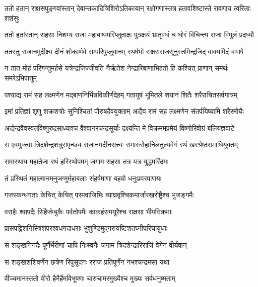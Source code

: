 
\twolineshloka
{ततो हतान् राक्षसपुङ्गवांस्तान् देवान्तकादित्रिशिरोऽतिकायान्}
{रक्षोगणास्तत्र हतावशिष्टास्ते रावणाय त्वरिताः शशंसुः} %

\twolineshloka
{ततो हतांस्तान् सहसा निशम्य राजा महाबाष्पपरिप्लुताक्षः}
{पुत्रक्षयं भ्रातृवधं च घोरं विचिन्त्य राजा विपुलं प्रदध्यौ} %

\twolineshloka
{ततस्तु राजानमुदीक्ष्य दीनं शोकार्णवे सम्परिपुप्लुवानम्}
{रथर्षभो राक्षसराजसूनुस्तमिन्द्रजिद् वाक्यमिदं बभाषे} %

\twolineshloka
{न तात मोहं परिगन्तुमर्हसे यत्रेन्द्रजिज्जीवति नैर्ऋतेश}
{नेन्द्रारिबाणाभिहतो हि कश्चित् प्राणान् समर्थः समरेऽभिपातुम्} %

\twolineshloka
{पश्याद्य रामं सह लक्ष्मणेन मद्बाणनिर्भिन्नविकीर्णदेहम्}
{गतायुषं भूमितले शयानं शितैः शरैराचितसर्वगात्रम्} %

\twolineshloka
{इमां प्रतिज्ञां शृणु शक्रशत्रोः सुनिश्चितां पौरुषदैवयुक्ताम्}
{अद्यैव रामं सह लक्ष्मणेन संतर्पयिष्यामि शरैरमोघैः} %

\twolineshloka
{अद्येन्द्रवैवस्वतविष्णुरुद्रसाध्याश्च वैश्वानरचन्द्रसूर्याः}
{द्रक्ष्यन्ति मे विक्रममप्रमेयं विष्णोरिवोग्रं बलियज्ञवाटे} %

\twolineshloka
{स एवमुक्त्वा त्रिदशेन्द्रशत्रुरापृच्छ्य राजानमदीनसत्त्वः}
{समारुरोहानिलतुल्यवेगं रथं खरश्रेष्ठसमाधियुक्तम्} %

\twolineshloka
{समास्थाय महातेजा रथं हरिरथोपमम्}
{जगाम सहसा तत्र यत्र युद्धमरिंदमः} %

\twolineshloka
{तं प्रस्थितं महात्मानमनुजग्मुर्महाबलाः}
{संहर्षमाणा बहवो धनुःप्रवरपाणयः} %

\twolineshloka
{गजस्कन्धगताः केचित् केचित् परमवाजिभिः}
{व्याघ्रवृश्चिकमार्जारखरोष्ट्रैश्च भुजङ्गमैः} %

\twolineshloka
{वराहैः श्वापदैः सिंहैर्जम्बुकैः पर्वतोपमैः}
{काकहंसमयूरैश्च राक्षसा भीमविक्रमाः} %

\twolineshloka
{प्रासपट्टिशनिस्त्रिंशपरश्वधगदाधराः}
{भुशुण्डिमुद्गरायष्टिशतघ्नीपरिघायुधाः} %

\twolineshloka
{स शङ्खनिनदैः पूर्णैर्भेरीणां चापि निःस्वनैः}
{जगाम त्रिदशेन्द्रारिराजिं वेगेन वीर्यवान्} %

\twolineshloka
{स शङ्खशशिवर्णेन छत्रेण रिपुसूदनः}
{रराज प्रतिपूर्णेन नभश्चन्द्रमसा यथा} %

\twolineshloka
{वीज्यमानस्ततो वीरो हैमैर्हेमविभूषणः}
{चारुचामरमुख्यैश्च मुख्यः सर्वधनुष्मताम्} %


